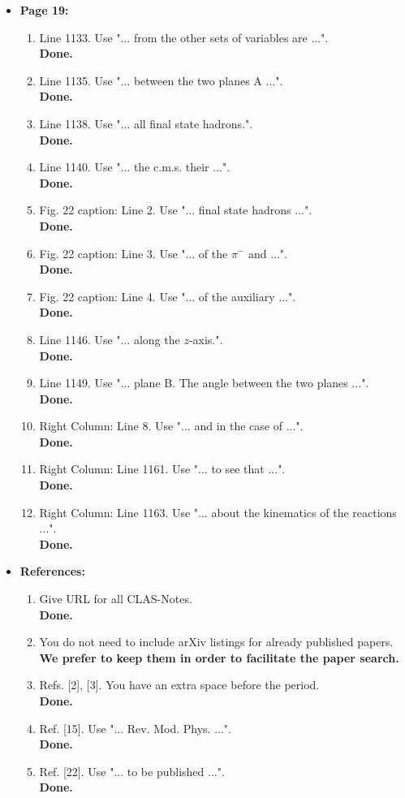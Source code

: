 \documentclass[,superscriptaddress,showpacs,amssymb,amsmath,amsfonts,linenumbers,article]{revtex4-1}
\begin{document}
\begin{itemize}
\item {\bf \large  Page 19:}
\begin{enumerate}
\item Line 1133. Use "... from the other sets of variables are ...".\\
{\bf Done.}
\item Line 1135. Use "... between the two planes A ...".\\
{\bf Done.}
\item Line 1138. Use "... all final state hadrons.".\\
{\bf Done.}
\item Line 1140. Use "... the c.m.s. their ...".\\
{\bf Done.}
\item Fig. 22 caption: Line 2. Use "... final state hadrons ...".\\
{\bf Done.}
\item Fig. 22 caption: Line 3. Use "... of the $\pi^-$ and ...".\\
{\bf Done.}
\item Fig. 22 caption: Line 4. Use "... of the auxiliary ...".\\
{\bf Done.}
\item Line 1146. Use "... along the $z$-axis.".\\
{\bf Done.}
\item Line 1149. Use "... plane B. The angle between the two planes ...".\\
{\bf Done.}
\item Right Column: Line 8. Use "... and in the case of ...".\\
{\bf Done.}
\item Right Column: Line 1161. Use "... to see that ...".\\
{\bf Done.}
\item Right Column: Line 1163. Use "... about the kinematics of the reactions ...".\\
{\bf Done.}

\end{enumerate}  


\item {\bf \large References:}
\begin{enumerate}

\item Give URL for all CLAS-Notes.\\
{\bf Done.}
\item You do not need to include arXiv listings for already published papers.\\
{\bf We prefer to keep them in order to facilitate the paper search.}
\item Refs. [2], [3]. You have an extra space before the period.\\
{\bf Done.}
\item Ref. [15]. Use "... Rev. Mod. Phys. ...".\\
{\bf Done.}
\item Ref. [22]. Use "... to be published ...".\\
{\bf Done.}\\[1cm]


\end{enumerate}
\end{itemize}
\end{document}
